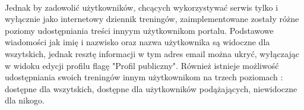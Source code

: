\paragraph{} %
\label{par:}

Jednak by zadowolić użytkowników, chcących wykorzystywać serwis tylko i wyłącznie jako internetowy dziennik treningów, zaimplementowane zostały różne poziomy udostępniania treści innyym użytkownikom portalu. Podstawowe wiadomości jak imię i nazwisko oraz nazwa użytkownika są widoczne dla wszytskich, jednak resztę informacji w tym adres email można ukryć, wyłączając w widoku edycji profilu flagę "Profil publiczny". Również istnieje możliwość udostępniania swoich treningów innym użytkownikom na trzech poziomach : dostępne dla wszytskich, dostępne dla użytkowników podążających, niewidoczne dla nikogo.


